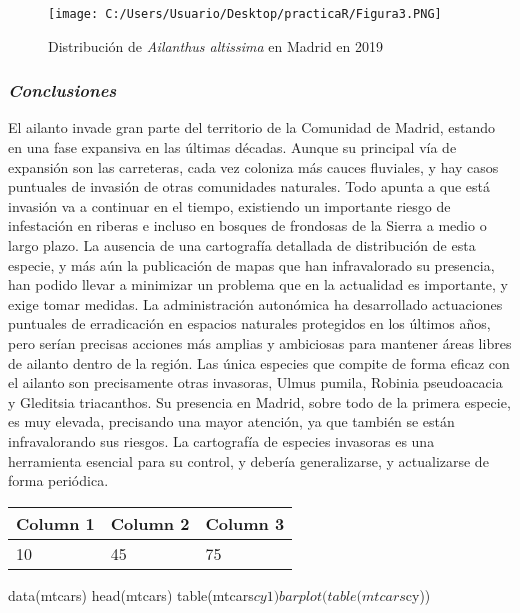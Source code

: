\documentclass[
]{article}
\begin{document}
\begin{figure}
\centering
\texttt{[image: C:/Users/Usuario/Desktop/practicaR/Figura3.PNG]}
\caption{Distribución de \emph{Ailanthus altissima} en Madrid en 2019}
\end{figure}

\hypertarget{conclusiones}{%
\subsubsection{\texorpdfstring{\emph{Conclusiones}}{Conclusiones}}\label{conclusiones}}

El ailanto invade gran parte del territorio de la Comunidad de Madrid,
estando en una fase expansiva en las últimas décadas. Aunque su
principal vía de expansión son las carreteras, cada vez coloniza más
cauces fluviales, y hay casos puntuales de invasión de otras comunidades
naturales. Todo apunta a que está invasión va a continuar en el tiempo,
existiendo un importante riesgo de infestación en riberas e incluso en
bosques de frondosas de la Sierra a medio o largo plazo. La ausencia de
una cartografía detallada de distribución de esta especie, y más aún la
publicación de mapas que han infravalorado su presencia, han podido
llevar a minimizar un problema que en la actualidad es importante, y
exige tomar medidas. La administración autonómica ha desarrollado
actuaciones puntuales de erradicación en espacios naturales protegidos
en los últimos años, pero serían precisas acciones más amplias y
ambiciosas para mantener áreas libres de ailanto dentro de la región.
Las única especies que compite de forma eficaz con el ailanto son
precisamente otras invasoras, Ulmus pumila, Robinia pseudoacacia y
Gleditsia triacanthos. Su presencia en Madrid, sobre todo de la primera
especie, es muy elevada, precisando una mayor atención, ya que también
se están infravalorando sus riesgos. La cartografía de especies
invasoras es una herramienta esencial para su control, y debería
generalizarse, y actualizarse de forma periódica.

\begin{longtable}[]{@{}lll@{}}
\toprule()
Column 1 & Column 2 & Column 3 \\
\midrule()
\endhead
10 & 45 & 75 \\
\bottomrule()
\end{longtable}

data(mtcars) head(mtcars) table(mtcars\(cy1) barplot(table(mtcars\)cy))
\end{document}
